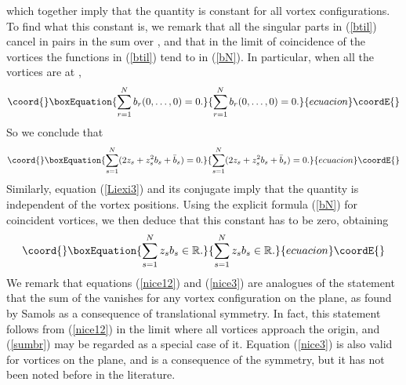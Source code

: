 \documentclass[a4paper,11pt]{article}
\begin{document}
which together imply that the quantity
\coordHE{}
is constant for all vortex configurations. 
To find what this constant is, we remark that all the singular parts
in (\ref{btil}) cancel in pairs in the sum over \coordHE{}, and that
in the limit of coincidence of the vortices the functions 
\coordHE{} in (\ref{btil}) tend to \coordHE{} in (\ref{bN}).
In particular, when all the vortices are at \coordHE{},
\begin{equation}\coord{}\boxEquation{ \label{sumbr}
\sum_{r=1}^{N} b_{r}(0,\ldots,0)=0.
}{ \sum_{r=1}^{N} b_{r}(0,\ldots,0)=0.
}{ecuacion}\coordE{}\end{equation}
So we conclude that
\begin{equation}\coord{}\boxEquation{ \label{nice12}
\sum_{s=1}^{N}(2z_{s}+z_{s}^{2}b_{s}+\bar{b}_{s})=0.
}{ \sum_{s=1}^{N}(2z_{s}+z_{s}^{2}b_{s}+\bar{b}_{s})=0.
}{ecuacion}\coordE{}\end{equation}
Similarly, equation (\ref{Liexi3}) and its conjugate
imply that the quantity 
\coordHE{}
is independent of the vortex positions. 
Using the explicit formula (\ref{bN}) for \coordHE{} coincident vortices,
we then deduce that this constant has to be zero, obtaining
\begin{equation}\coord{}\boxEquation{\label{nice3}
\sum_{s=1}^{N} z_{s}b_{s} \in \mathbb{R}.
}{\sum_{s=1}^{N} z_{s}b_{s} \in \mathbb{R}.
}{ecuacion}\coordE{}\end{equation}
We remark that equations (\ref{nice12}) and (\ref{nice3}) are
analogues of the statement that the sum of the \coordHE{} vanishes
for any vortex configuration on the plane, as found by
Samols \cite{Sam} as a consequence of translational symmetry.
In fact, this statement follows from (\ref{nice12}) in the limit where
all vortices approach the origin, and (\ref{sumbr}) may be
regarded as a special case of it. Equation (\ref{nice3}) is also
valid for vortices on the plane, and is a consequence of the \coordHE{} 
symmetry, but it has not been noted before in the literature.
\end{document}
